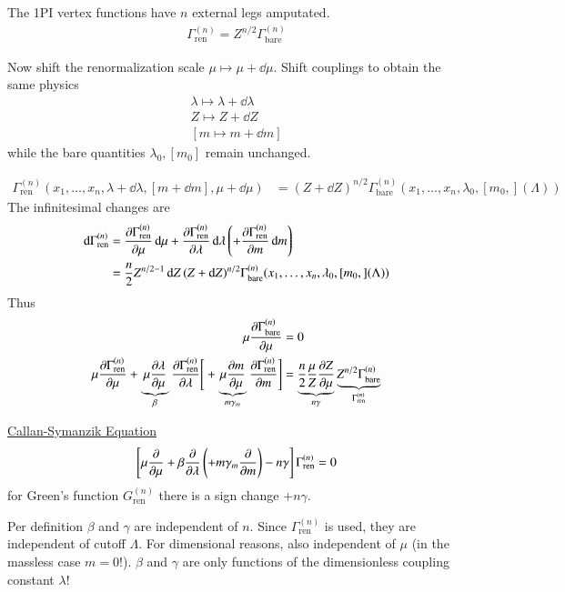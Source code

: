 The 1PI vertex functions have $n$ external legs amputated.
\begin{align}
   \Gamma_\text{ren}^{(n)} = Z^{n/2} \Gamma_\text{bare}^{(n)}
\end{align}

Now shift the renormalization scale $\mu \mapsto \mu + \dd{\mu}$. Shift couplings to obtain the same physics
\begin{align*}
   \lambda \mapsto \lambda + \dd{\lambda} \\
   Z \mapsto Z + \dd{Z} \\
   [m \mapsto m + \dd{m} ] 
\end{align*}
while the bare quantities $\lambda_0, [m_0] $ remain unchanged.

\begin{align}
   \Gamma_\text{ren}^{(n)}(x_1, \dots, x_n, \lambda + \dd{\lambda}, [m + \dd{m}], \mu + \dd{\mu}) &= (Z+ \dd{Z})^{n/2} \Gamma_\text{bare}^{(n)}(x_1,\dots, x_n, \lambda_0, [m_0,] (\Lambda))
\end{align}
The infinitesimal changes are
\begin{align*}
   \dd{\Gamma}_\text{ren}^{(n)} &= \pdv{\Gamma_\text{ren}^{(n)}}{\mu} \dd{\mu} + \pdv{\Gamma^{(n)}_\text{ren}}{\lambda} \dd{\lambda} \left( + \pdv{\Gamma_\text{ren}^{(n)}}{m} \dd{m} \right) \\
                                &= \frac{n}{2} Z^{n/2-1} \dd{Z} (Z+ \dd{Z})^{n/2} \Gamma_\text{bare}^{(n)}(x_1,\dots, x_n, \lambda_0, [m_0,] (\Lambda))
\end{align*}
Thus
\begin{align*}
   \mu \pdv{\Gamma_\text{bare}^{(n)}}{\mu} &= 0 \\
   \mu \pdv{\Gamma_\text{ren}^{(n)}}{\mu} + \underbrace{ \mu \pdv{\lambda}{\mu}  }_{\beta} \pdv{\Gamma_\text{ren}^{(n)}}{\lambda} \Bigg[ + \underbrace{\mu \pdv{m}{\mu}}_{m \gamma_m} \pdv{\Gamma_\text{ren}^{(n)}}{m} \Bigg] &= \underbrace{\frac{n}{2} \frac{\mu}{Z} \pdv{Z}{\mu}}_{n \gamma} \underbrace{Z^{n/2} \Gamma_\text{bare}^{(n)}}_{\Gamma_\text{ren}^{(n)}}
\end{align*}

\underline{Callan-Symanzik Equation}
\begin{align}
   \left[ \mu \pdv{\mu} + \beta \pdv{\lambda} \left( + m \gamma_m \pdv{m} \right) - n \gamma \right] \Gamma_\text{ren}^{(n)} = 0
\end{align}
for Green's function $G_\text{ren}^{(n)}$ there is a sign change $+n\gamma$.

Per definition $\beta$ and $\gamma$ are independent of $n$. Since $\Gamma^{(n)}_\text{ren}$ is used, they are independent of cutoff $\Lambda$. For dimensional reasons, also independent of $\mu$ (in the massless case $m=0$!). $\beta$ and $\gamma$ are only functions of the dimensionless coupling constant $\lambda$! 

